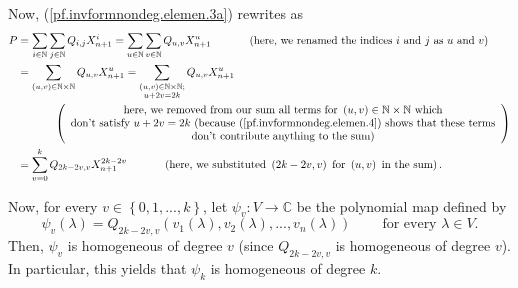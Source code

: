 \documentclass[etingof-lie.tex]{subfiles}
\begin{document}
Now, (\ref{pf.invformnondeg.elemen.3a}) rewrites as%
\begin{align*}
P  &  =\sum\limits_{i\in\mathbb{N}}\sum\limits_{j\in\mathbb{N}}Q_{i,j}%
X_{n+1}^{i}=\sum\limits_{u\in\mathbb{N}}\sum\limits_{v\in\mathbb{N}}%
Q_{u,v}X_{n+1}^{u}\ \ \ \ \ \ \ \ \ \ \left(  \text{here, we renamed the
indices }i\text{ and }j\text{ as }u\text{ and }v\right) \\
&  =\sum\limits_{\left(  u,v\right)  \in\mathbb{N}\times\mathbb{N}}%
Q_{u,v}X_{n+1}^{u}=\sum\limits_{\substack{\left(  u,v\right)  \in
\mathbb{N}\times\mathbb{N};\\u+2v=2k}}Q_{u,v}X_{n+1}^{u}\\
&  \ \ \ \ \ \ \ \ \ \ \left(
\begin{array}
[c]{c}%
\text{here, we removed from our sum all terms for }\left(  u,v\right)
\in\mathbb{N}\times\mathbb{N}\text{ which}\\
\text{don't satisfy }u+2v=2k\text{ (because (\ref{pf.invformnondeg.elemen.4})
shows that these terms}\\
\text{don't contribute anything to the sum)}%
\end{array}
\right) \\
&  =\sum\limits_{v=0}^{k}Q_{2k-2v,v}X_{n+1}^{2k-2v}\ \ \ \ \ \ \ \ \ \ \left(
\text{here, we substituted }\left(  2k-2v,v\right)  \text{ for }\left(
u,v\right)  \text{ in the sum}\right)  .
\end{align*}


Now, for every $v\in\left\{  0,1,...,k\right\}  $, let $\psi_{v}%
:V\rightarrow\mathbb{C}$ be the polynomial map defined by%
\[
\psi_{v}\left(  \lambda\right)  =Q_{2k-2v,v}\left(  v_{1}\left(
\lambda\right)  ,v_{2}\left(  \lambda\right)  ,...,v_{n}\left(  \lambda
\right)  \right)  \ \ \ \ \ \ \ \ \ \ \text{for every }\lambda\in V.
\]
Then, $\psi_{v}$ is homogeneous of degree $v$ (since $Q_{2k-2v,v}$ is
homogeneous of degree $v$). In particular, this yields that $\psi_{k}$ is
homogeneous of degree $k$.
\end{document}
